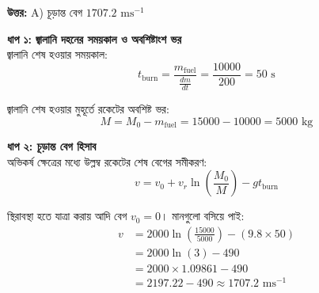 \documentclass[12pt, a4paper]{article}
\begin{document}
\vspace{0.5em}
\begin{tcolorbox}[answerbox]
    \textbf{\color{success} উত্তর:} A) চূড়ান্ত বেগ $1707.2\text{ ms}^{-1}$
\end{tcolorbox}
\vspace{1em}

\begin{tcolorbox}[solutionbox={সমাধান (Solution)}]
    \noindent
    \textbf{ধাপ ১: জ্বালানি দহনের সময়কাল ও অবশিষ্টাংশ ভর} \\
    জ্বালানি শেষ হওয়ার সময়কাল:
    \[ t_{\text{burn}} = \frac{m_{\text{fuel}}}{\frac{dm}{dt}} = \frac{10000}{200} = 50\text{ s} \]
    
    জ্বালানি শেষ হওয়ার মুহূর্তে রকেটের অবশিষ্ট ভর:
    \[ M = M_0 - m_{\text{fuel}} = 15000 - 10000 = 5000\text{ kg} \]
    
    \vspace{0.5em}
    \noindent\textbf{ধাপ ২: চূড়ান্ত বেগ হিসাব} \\
    অভিকর্ষ ক্ষেত্রের মধ্যে উল্লম্ব রকেটের শেষ বেগের সমীকরণ:
    \[ v = v_0 + v_r \ln\left(\frac{M_0}{M}\right) - g t_{\text{burn}} \]
    
    স্থিরাবস্থা হতে যাত্রা করায় আদি বেগ $v_0 = 0$। মানগুলো বসিয়ে পাই:
    \begin{align*}
        v &= 2000 \ln\left(\frac{15000}{5000}\right) - (9.8 \times 50) \\
          &= 2000 \ln(3) - 490 \\
          &= 2000 \times 1.09861 - 490 \\
          &= 2197.22 - 490 \approx \mathbf{1707.2}\text{ ms}^{-1}
    \end{align*}
\end{tcolorbox}

\newpage
\end{document}
